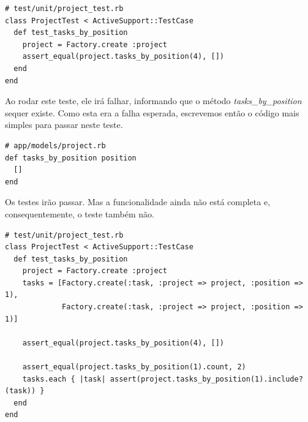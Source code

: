 \begin{lstlisting}[caption=Teste para o método Project\#tasks\_by\_position (versão 1),label=code:tdd_spec1]
# test/unit/project_test.rb
class ProjectTest < ActiveSupport::TestCase
  def test_tasks_by_position
    project = Factory.create :project
    assert_equal(project.tasks_by_position(4), [])
  end
end
\end{lstlisting}

Ao rodar este teste, ele irá falhar, informando que o método \textit{tasks\_by\_position} sequer existe. Como esta era a falha esperada, escrevemos então o código mais simples para passar neste teste.

\begin{lstlisting}[caption=Código do método Project\#tasks\_by\_position (versão 1),label=code:tdd_code1]
# app/models/project.rb
def tasks_by_position position
  []
end
\end{lstlisting}

Os testes irão passar. Mas a funcionalidade ainda não está completa e, consequentemente, o teste também não.




\begin{lstlisting}[caption=Teste do método Project\#tasks\_by\_position (versão 2),label=code:tdd_spec2]
# test/unit/project_test.rb
class ProjectTest < ActiveSupport::TestCase
  def test_tasks_by_position
    project = Factory.create :project
    tasks = [Factory.create(:task, :project => project, :position => 1),
             Factory.create(:task, :project => project, :position => 1)]

    assert_equal(project.tasks_by_position(4), [])

    assert_equal(project.tasks_by_position(1).count, 2)
    tasks.each { |task| assert(project.tasks_by_position(1).include?(task)) }
  end
end
\end{lstlisting}

